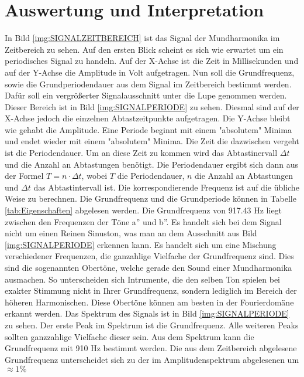 \section{Auswertung und Interpretation}
\label{chap:VERSUCH_1_AUSWERTUNG}
In Bild \ref{img:SIGNALZEITBEREICH} ist das Signal der Mundharmonika im Zeitbereich zu sehen. Auf den ersten Blick scheint es sich wie erwartet um ein periodisches Signal zu handeln. Auf der X-Achse ist die Zeit in Millisekunden und auf der Y-Achse die Amplitude in Volt aufgetragen. Nun soll die Grundfrequenz, sowie die Grundperiodendauer aus dem Signal im Zeitbereich bestimmt werden. Dafür soll ein vergrößerter Signalausschnitt  unter die Lupe genommen werden. Dieser Bereich ist in Bild \ref{img:SIGNALPERIODE} zu sehen. Diesmal sind auf der X-Achse jedoch die einzelnen Abtastzeitpunkte aufgetragen. Die Y-Achse bleibt wie gehabt die Amplitude. Eine Periode beginnt mit einem "absolutem" Minima und endet wieder mit einem "absolutem" Minima. Die Zeit die dazwischen vergeht ist die Periodendauer. Um an diese Zeit zu kommen wird das Abtastinervall $\Delta t$ und die Anzahl an Abtastungen benötigt. Die Periodendauer ergibt sich dann aus der Formel $T = n \cdot \Delta t$, wobei $T$ die Periodendauer, $n$ die Anzahl an Abtastungen und $\Delta t$ das Abtastintervall ist. Die korrespondierende Frequenz ist auf die übliche Weise zu berechnen. Die Grundfrequenz und die Grundperiode können in Tabelle \ref{tab:Eigenschaften} abgelesen werden. Die Grundfrequenz von 917.43 Hz liegt zwischen den Frequenzen der Töne a'' und b''. Es handelt sich bei dem Signal nicht um einen Reinen Sinuston, was man an dem Ausschnitt aus Bild \ref{img:SIGNALPERIODE} erkennen kann. Es handelt sich um eine Mischung verschiedener Frequenzen, die ganzahlige Vielfache der Grundfrequenz sind. Dies sind die sogenannten Obertöne, welche gerade den Sound einer Mundharmonika ausmachen. So unterscheiden sich Intrumente, die den selben Ton spielen bei exakter Stimmung nicht in Ihrer Grundfrequenz, sondern lediglich im Bereich der höheren Harmonischen. Diese Obertöne können am besten in der Fourierdomäne erkannt werden. Das Spektrum des Signals ist in Bild \ref{img:SIGNALPERIODE} zu sehen. Der erste Peak im Spektrum ist die Grundfrequenz. Alle weiteren Peaks sollten ganzzahlige Vielfache dieser sein. Aus dem Spektrum kann die Grundfrequenz mit 910 Hz bestimmt werden. Die aus dem Zeitbereich abgelesene Grundfrequenz unterscheidet sich zu der im Amplitudenspektrum abgelesenen um $\approx 1\%$
